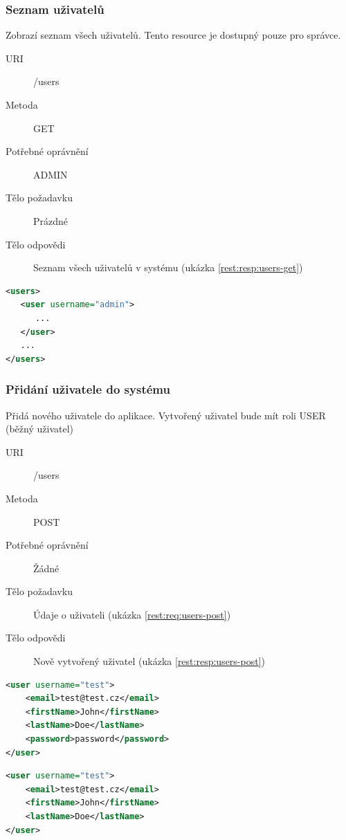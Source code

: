 \documentclass[thesis=M,czech]{FITthesis}[2014/05/6]
\begin{document}
\subsubsection{Seznam uživatelů}
Zobrazí seznam všech uživatelů. Tento resource je dostupný pouze pro správce.
\begin{description}
  \item[URI] /users
  \item[Metoda] GET
  \item[Potřebné oprávnění] ADMIN
  \item[Tělo požadavku] Prázdné
  \item[Tělo odpovědi] Seznam všech uživatelů v systému (ukázka \ref{rest:resp:users-get})
\end{description}

\begin{lstlisting}[caption=Tělo odpovědi zdroje /users (GET), label=rest:resp:users-get, language=xml]
<users>
   <user username="admin">
      ...
   </user>
   ...
</users>
\end{lstlisting}  

\subsubsection{Přidání uživatele do systému}
Přidá nového uživatele do aplikace. Vytvořený uživatel bude mít roli USER (běžný uživatel)
\begin{description}
  \item[URI] /users
  \item[Metoda] POST
  \item[Potřebné oprávnění] Žádné
  \item[Tělo požadavku] Údaje o uživateli (ukázka \ref{rest:req:users-post})
  \item[Tělo odpovědi] Nově vytvořený uživatel (ukázka \ref{rest:resp:users-post})
\end{description}

\begin{lstlisting}[caption=Tělo požadavku zdroje /users (POST), label=rest:req:users-post, language=xml]
<user username="test">
    <email>test@test.cz</email>
    <firstName>John</firstName>
    <lastName>Doe</lastName>
    <password>password</password>
</user>
\end{lstlisting}  

\begin{lstlisting}[caption=Tělo odpovědi zdroje /users (POST), label=rest:resp:users-post, language=xml]
<user username="test">
    <email>test@test.cz</email>
    <firstName>John</firstName>
    <lastName>Doe</lastName>
</user>
\end{lstlisting}
\end{document}
